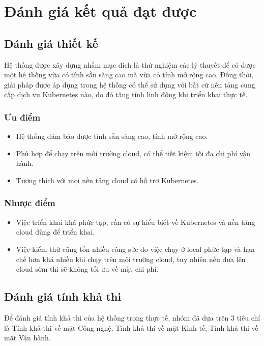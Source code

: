 \section{Đánh giá kết quả đạt được}
\subsection{Đánh giá thiết kế}
\noindent Hệ thống được xây dựng nhằm mục đích là thử nghiệm các lý thuyết để có được một hệ thống vừa có tính sẵn sàng cao mà vừa có tính mở rộng cao. Đồng thời, giải pháp được áp dụng trong hệ thống có thể sử dụng với bất cứ nền tảng cung cấp dịch vụ Kubernetes nào, do đó tăng tính linh động khi triển khai thực tế.
\subsubsection{Ưu điểm}
\begin{itemize}
    \item Hệ thống đảm bảo được tính sẵn sàng cao, tính mở rộng cao.
    \item Phù hợp để chạy trên môi trường cloud, có thể tiết kiệm tối đa chi phí vận hành.
    \item Tương thích với mọi nền tảng cloud có hỗ trợ Kubernetes.
\end{itemize}
\subsubsection{Nhược điểm}
\begin{itemize}
    \item Việc triển khai khá phức tạp, cần có sự hiểu biết về Kubernetes và nền tảng cloud dùng để triển khai.
    \item Việc kiểm thử cũng tốn nhiều công sức do việc chạy ở local phức tạp và hạn chế hơn khá nhiều khi chạy trên môi trường cloud, tuy nhiên nếu đưa lên cloud sớm thì sẽ không tối ưu về mặt chi phí.
\end{itemize}
\subsection{Đánh giá tính khả thi}
\noindent Để đánh giá tính khả thi của hệ thống trong thực tế, nhóm đã dựa trên 3 tiêu chí là Tính khả thi về mặt Công nghệ, Tính khả thi về mặt Kinh tế, Tính khả thi về mặt Vận hành.
